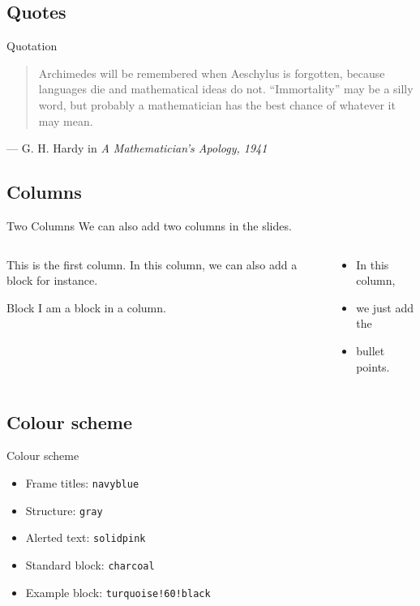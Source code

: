 \documentclass[]{beamer}
\begin{document}
\subsection{Quotes}

\begin{frame}[label=quot]{Quotation}
\begin{quote}
Archimedes will be remembered when Aeschylus is forgotten, because languages die and mathematical ideas do not. ``Immortality'' may be a silly word, but probably a mathematician has the best chance of whatever it may mean.
\end{quote}
\hfill --- G. H. Hardy in \textit{A Mathematician's Apology, 1941}

\end{frame}

\subsection{Columns}

	\begin{frame}{Two Columns}
		We can also add two columns in the slides.
		\begin{columns}[t]
			\begin{column}[T]{0.4\textwidth}
				This is the first column. In this column, we can also add a block for instance.
				\vspace{1em}
				\begin{block}{Block}
					I am a block in a column.
				\end{block}
			\end{column}
			\begin{column}[T]{0.4\textwidth}
				\begin{itemize}
					\item In this column,
					\item we just add the
					\item bullet points.
				\end{itemize}
			\end{column}
		\end{columns}
	\end{frame}

\subsection{Colour scheme}

\begin{frame}{Colour scheme}

\begin{itemize}
	\item {\color{navyblue} Frame titles: \texttt{navyblue}}
	\item  {\color{gray} Structure: \texttt{gray}}
	\item  {\color{solidpink} Alerted text: \texttt{solidpink}}
	\item  {\color{charcoal} Standard block: \texttt{charcoal}}
	\item  {\color{turquoise!60!black} Example block: \texttt{turquoise!60!black}}

\end{itemize}

\end{frame}
\end{document}
